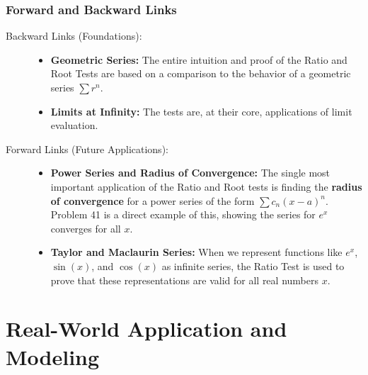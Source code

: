 \documentclass{article}
\begin{document}
\section{Forward and Backward Links}
\begin{description}
    \item[Backward Links (Foundations):]
    \begin{itemize}
        \item \textbf{Geometric Series:} The entire intuition and proof of the Ratio and Root Tests are based on a comparison to the behavior of a geometric series $\sum r^n$.
        \item \textbf{Limits at Infinity:} The tests are, at their core, applications of limit evaluation.
    \end{itemize}
    \item[Forward Links (Future Applications):]
    \begin{itemize}
        \item \textbf{Power Series and Radius of Convergence:} The single most important application of the Ratio and Root tests is finding the \textbf{radius of convergence} for a power series of the form $\sum c_n (x-a)^n$. Problem 41 is a direct example of this, showing the series for $e^x$ converges for all $x$.
        \item \textbf{Taylor and Maclaurin Series:} When we represent functions like $e^x$, $\sin(x)$, and $\cos(x)$ as infinite series, the Ratio Test is used to prove that these representations are valid for all real numbers $x$.
    \end{itemize}
\end{description}

\part{Real-World Application and Modeling}
\end{document}
